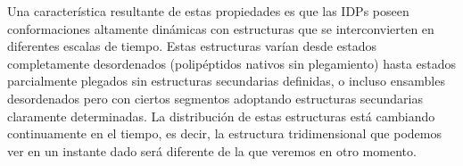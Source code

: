 




Una característica resultante de estas propiedades es que las IDPs poseen conformaciones altamente dinámicas con estructuras que se interconvierten en diferentes escalas de tiempo. 
Estas estructuras varían desde estados completamente desordenados (polipéptidos nativos sin plegamiento) hasta estados parcialmente plegados sin estructuras secundarias definidas, 
o incluso ensambles desordenados pero con ciertos segmentos adoptando estructuras secundarias claramente determinadas.
La distribución de estas estructuras está cambiando continuamente en el tiempo, es decir, la estructura tridimensional que podemos ver en un instante dado será diferente de la que veremos en otro momento.





